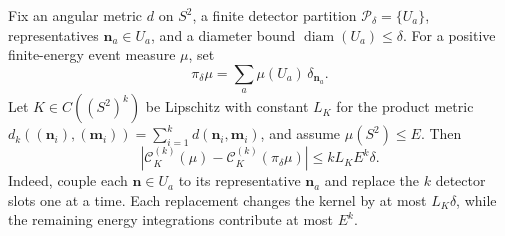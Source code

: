 \begin{controlledapproximation}
\label{ca:finite-resolution-eec-observable-assembly}
Fix an angular metric \(d\) on \(S^2\), a finite detector partition
\(\mathcal P_\delta=\{U_a\}\), representatives \(\mathbf n_a\in U_a\),
and a diameter bound \(\operatorname{diam}(U_a)\leq\delta\).  For a positive
finite-energy event measure \(\mu\), set
\begin{equation}
  \pi_\delta\mu
  =
  \sum_a \mu(U_a)\,\delta_{\mathbf n_a}.
  \label{eq:finite-resolution-eec-binned-measure}
\end{equation}
Let \(K\in C((S^2)^k)\) be Lipschitz with constant \(L_K\) for the product
metric \(d_k((\mathbf n_i),(\mathbf m_i))=\sum_{i=1}^k d(\mathbf n_i,\mathbf
m_i)\), and assume \(\mu(S^2)\leq E\).  Then
\begin{equation}
  \left|
  \mathcal C_K^{(k)}(\mu)
  -
  \mathcal C_K^{(k)}(\pi_\delta\mu)
  \right|
  \leq
  k L_K E^k\delta .
  \label{eq:finite-resolution-eec-lipschitz-bound}
\end{equation}
Indeed, couple each \(\mathbf n\in U_a\) to its representative
\(\mathbf n_a\) and replace the \(k\) detector slots one at a time.  Each
replacement changes the kernel by at most \(L_K\delta\), while the remaining
energy integrations contribute at most \(E^k\).


\end{controlledapproximation}
